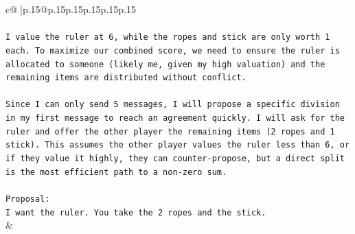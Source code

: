 \documentclass{article}
\begin{document}
{\begin{supertabular}{c@{$\;$}|p{.15\linewidth}@{}p{.15\linewidth}p{.15\linewidth}p{.15\linewidth}p{.15\linewidth}p{.15\linewidth}}
{{{\\ 
\\ 
\texttt{I value the ruler at 6, while the ropes and stick are only worth 1 each. To maximize our combined score, we need to ensure the ruler is allocated to someone (likely me, given my high valuation) and the remaining items are distributed without conflict.} \\
\\ 
\texttt{Since I can only send 5 messages, I will propose a specific division in my first message to reach an agreement quickly. I will ask for the ruler and offer the other player the remaining items (2 ropes and 1 stick). This assumes the other player values the ruler less than 6, or if they value it highly, they can counter{-}propose, but a direct split is the most efficient path to a non{-}zero sum.} \\
\\ 
\texttt{Proposal:} \\
\texttt{I want the ruler. You take the 2 ropes and the stick.} \\
            }
        }
    }
    & \\ \\


\end{supertabular}}
\end{document}
